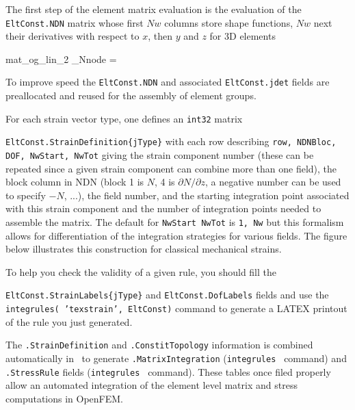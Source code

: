  The first step of the element matrix evaluation is the evaluation of the {\tt EltConst.NDN} matrix whose first $Nw$ columns store shape functions, $Nw$ next their derivatives with respect to $x$, then $y$ and $z$ for 3D elements
%
\begin{eqsvg}{mat_og_lin_2}
 _{Nnode } = 
\end{eqsvg}
To improve speed the {\tt EltConst.NDN} and associated {\tt EltConst.jdet} fields are preallocated and reused for the assembly of element groups.

For each strain vector type, one defines an {\tt int32} matrix \par {\tt EltConst.StrainDefinition\{jType\}} with each row describing  {\tt row, NDNBloc, DOF, NwStart, NwTot} giving the strain component number (these can be repeated since a given strain component can combine more than one field), the block column in NDN (block 1 is $N$, 4 is $\partial N/\partial z$, a negative number can be used to specify $-N$, ...), the field number, and the starting integration point associated with this strain component and the number of integration points needed to assemble the matrix. The default for {\tt NwStart NwTot} is {\tt 1, Nw} but this formalism allows for differentiation of the integration strategies for various fields. The figure below illustrates this construction for classical mechanical strains.

\vspace*{.5cm}

To help you check the validity of a given rule, you should fill the \par {\tt EltConst.StrainLabels\{jType\}} and {\tt EltConst.DofLabels} fields and use the\\ {\tt integrules( 'texstrain', EltConst)} command to generate a LATEX printout of the rule you just generated.

The {\tt .StrainDefinition} and {\tt .ConstitTopology} information is combined automatically in \integrules\ to generate {\tt .MatrixIntegration} ({\tt integrules } command) and {\tt .StressRule} fields ({\tt integrules } command). These tables once filed properly allow an automated integration of the element level matrix and stress computations in OpenFEM.

